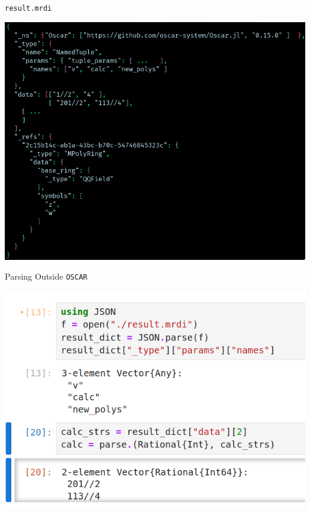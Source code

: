 \documentclass[9pt]{beamer}
\newcommand\oscar{\texttt{OSCAR}\xspace}
\theoremstyle{definition}
\begin{document}


\begin{frame}[fragile]{\texttt{result.mrdi}}
  \begin{center}
    \includegraphics[height=.8\textheight]{images/example-file}
  \end{center}
\end{frame}



\begin{frame}[fragile]{Parsing Outside \oscar}
  \begin{center}
    \includegraphics[height=.5\textheight]{images/read_json}
  \end{center}
\end{frame}
\end{document}
